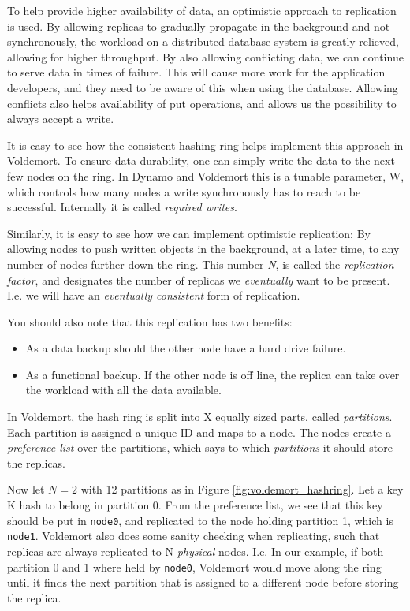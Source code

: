 To help provide higher availability of data, an optimistic approach to replication is used.
By allowing replicas to gradually propagate in the background and not synchronously, the workload on a distributed database system is greatly relieved, allowing for higher throughput. By also allowing conflicting data, we can continue to serve data in times of failure. This will cause more work for the application developers, and they need to be aware of this when using the database. Allowing conflicts also helps availability of put operations, and allows us the possibility to always accept a write.

It is easy to see how the consistent hashing ring helps implement this approach in Voldemort.
To ensure data durability, one can simply write the data to the next few nodes on the ring. In Dynamo and Voldemort this is a tunable parameter, W, which controls how many nodes a write synchronously has to reach to be successful. 
Internally it is called \emph{required writes}.

Similarly, it is easy to see how we can implement optimistic replication:
By allowing nodes to push written objects in the background, at a later time, to any number of nodes further down the ring.
This number \emph{N}, is called the \emph{replication factor}, and designates the number of replicas we \emph{eventually} want to be present.
I.e. we will have an \emph{eventually consistent} form of replication.

You should also note that this replication has two benefits: 
\begin{itemize}
	\item As a data backup should the other node have a hard drive failure.
	\item As a functional backup. If the other node is off line, the replica can take over the workload with all the data available.
\end{itemize}

In Voldemort, the hash ring is split into X equally sized parts, called \emph{partitions}. Each partition is assigned a unique ID and maps to a node.
The nodes create a \emph{preference list} over the partitions, which says to which \emph{partitions} it should store the replicas.

Now let $N=2$ with 12 partitions as in Figure \ref{fig:voldemort_hashring}. 
Let a key K hash to belong in partition 0. From the preference list, we see that this key should be put in \texttt{node0}, and replicated to the node holding partition 1, which is \texttt{node1}.
Voldemort also does some sanity checking when replicating, such that replicas are always replicated to N \emph{physical} nodes. 
I.e. In our example, if both partition 0 and 1 where held by \texttt{node0}, Voldemort would move along the ring until it finds the next partition that is assigned to a different node before storing the replica.

